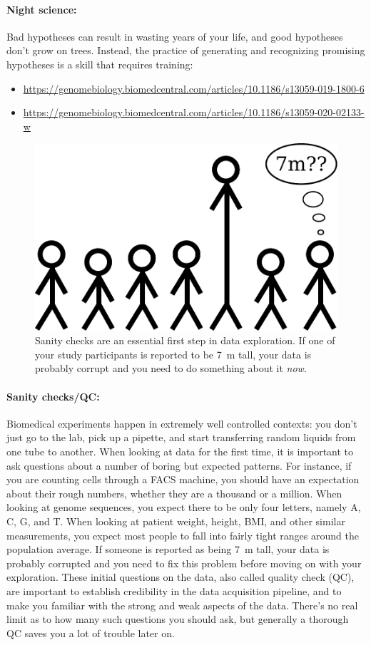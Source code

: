 \documentclass[12pt,a4paper,notitlepage,onecolumn]{article}
\begin{document}
\paragraph{Night science:} Bad hypotheses can result in wasting years of your life, and good hypotheses don't grow on trees. Instead, the practice of generating and recognizing promising hypotheses is a skill that requires training:

\begin{itemize}
\item {\footnotesize \url{https://genomebiology.biomedcentral.com/articles/10.1186/s13059-019-1800-6}}
\item {\footnotesize \url{https://genomebiology.biomedcentral.com/articles/10.1186/s13059-020-02133-w}}
\end{itemize}

\begin{figure}
\begin{center}
\includegraphics[width=0.4\linewidth]{7m.pdf}
\caption{Sanity checks are an essential first step in data exploration. If one of your study participants is reported to be 7~m tall, your data is probably corrupt and you need to do something about it \textit{now}.}
\label{fig:7m}
\end{center}
\end{figure}


\paragraph{Sanity checks/QC:} Biomedical experiments happen in extremely well controlled contexts: you don't just go to the lab, pick up a pipette, and start transferring random liquids from one tube to another. When looking at data for the first time, it is important to ask questions about a number of boring but expected patterns. For instance, if you are counting cells through a FACS machine, you should have an expectation about their rough numbers, whether they are a thousand or a million. When looking at genome sequences, you expect there to be only four letters, namely A, C, G, and T. When looking at patient weight, height, BMI, and other similar measurements, you expect most people to fall into fairly tight ranges around the population average. If someone is reported as being 7~m tall, your data is probably corrupted and you need to fix this problem before moving on with your exploration. These initial questions on the data, also called quality check (QC), are important to establish credibility in the data acquisition pipeline, and to make you familiar with the strong and weak aspects of the data. There's no real limit as to how many such questions you should ask, but generally a thorough QC saves you a lot of trouble later on.
\end{document}
